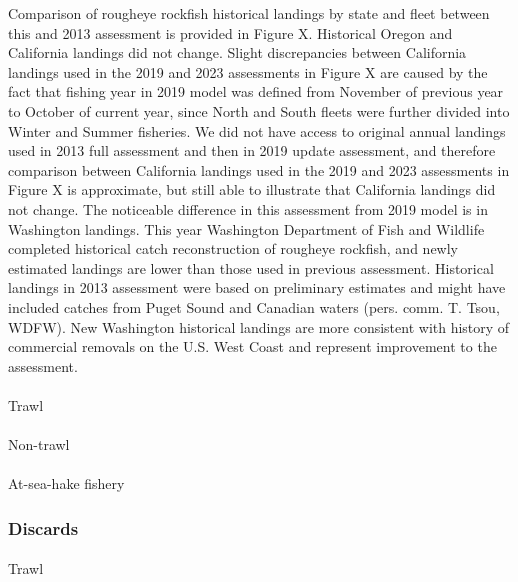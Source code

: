 \documentclass[
]{scrartcl}
\makeatletter
\let\oldparagraph\paragraph
\renewcommand{\paragraph}{
    \@ifstar
      \xxxParagraphStar
      \xxxParagraphNoStar
  }
\newcommand{\xxxParagraphStar}[1]{\oldparagraph*{#1}\mbox{}}
\newcommand{\xxxParagraphNoStar}[1]{\oldparagraph{#1}\mbox{}}
\makeatother
\begin{document}
Comparison of rougheye rockfish historical landings by state and fleet
between this and 2013 assessment is provided in Figure X. Historical
Oregon and California landings did not change. Slight discrepancies
between California landings used in the 2019 and 2023 assessments in
Figure X are caused by the fact that fishing year in 2019 model was
defined from November of previous year to October of current year, since
North and South fleets were further divided into Winter and Summer
fisheries. We did not have access to original annual landings used in
2013 full assessment and then in 2019 update assessment, and therefore
comparison between California landings used in the 2019 and 2023
assessments in Figure X is approximate, but still able to illustrate
that California landings did not change. The noticeable difference in
this assessment from 2019 model is in Washington landings. This year
Washington Department of Fish and Wildlife completed historical catch
reconstruction of rougheye rockfish, and newly estimated landings are
lower than those used in previous assessment. Historical landings in
2013 assessment were based on preliminary estimates and might have
included catches from Puget Sound and Canadian waters (pers. comm. T.
Tsou, WDFW). New Washington historical landings are more consistent with
history of commercial removals on the U.S. West Coast and represent
improvement to the assessment.

\paragraph{Trawl}\label{trawl}

\paragraph{Non-trawl}\label{non-trawl}

\paragraph{At-sea-hake fishery}\label{at-sea-hake-fishery}

\subsubsection{Discards}\label{discards}

\paragraph{Trawl}\label{trawl-1}
\end{document}
